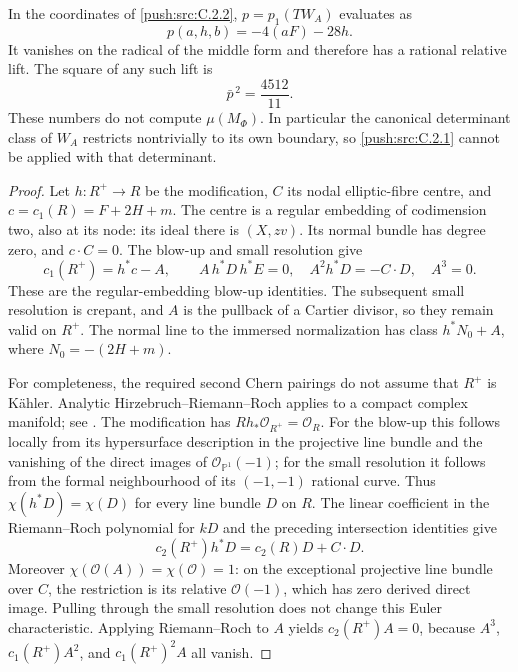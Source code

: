 \begin{proposition}\label{push:src:C.2.3}
In the coordinates of \ref{push:src:C.2.2}, $p=p_1(TW_A)$ evaluates as
\[
 p(a,h,b)=-4(aF)-28h.
\]
It vanishes on the radical of the middle form and therefore has a
rational relative lift. The square of any such lift is
\[
 \bar p^{\,2}=\frac{4512}{11}.
\]
These numbers do not compute $\mu(M_\Phi)$. In particular the
canonical determinant class of $W_A$ restricts nontrivially to its
own boundary, so \ref{push:src:C.2.1} cannot be applied with that determinant.
\end{proposition}

\begin{proof}
Let $h:R^+\to R$ be the modification, $C$ its nodal elliptic-fibre
centre, and $c=c_1(R)=F+2H+m$. The centre is a regular embedding of
codimension two, also at its node: its ideal there is $(X,zv)$.
Its normal bundle has degree zero, and $c\cdot C=0$. The blow-up
and small resolution give
\[
 c_1(R^+)=h^*c-A,\qquad
 A\,h^*D\,h^*E=0,\quad
 A^2h^*D=-C\cdot D,\quad A^3=0.
\]
These are the regular-embedding blow-up identities. The subsequent
small resolution is crepant, and $A$ is the pullback of a Cartier
divisor, so they remain valid on $R^+$. The normal line to the
immersed normalization has class
$h^*N_0+A$, where $N_0=-(2H+m)$.

For completeness, the required second Chern pairings do not assume
that $R^+$ is K\"ahler. Analytic Hirzebruch--Riemann--Roch applies to
a compact complex manifold; see \citet[Theorem~4.3, pp.~564--565]{AtiyahSinger1968IIIE}.
The modification has $Rh_*\mathcal O_{R^+}=\mathcal O_R$.
For the blow-up this follows locally from its hypersurface description
in the projective line bundle and the vanishing of the direct images
of $\mathcal O_{\mathbb P^1}(-1)$; for the small resolution it follows
from the formal neighbourhood of its $(-1,-1)$ rational curve.
Thus $\chi(h^*D)=\chi(D)$ for every line bundle $D$ on $R$.
The linear coefficient in the Riemann--Roch polynomial for $kD$
and the preceding intersection identities give
\[
 c_2(R^+)h^*D=c_2(R)D+C\cdot D.
\]
Moreover $\chi(\mathcal O(A))=\chi(\mathcal O)=1$: on the
exceptional projective line bundle over $C$, the restriction is its
relative $\mathcal O(-1)$, which has zero derived direct image.
Pulling through the small resolution does not change this Euler
characteristic. Applying Riemann--Roch to $A$ yields $c_2(R^+)A=0$,
because $A^3$, $c_1(R^+)A^2$, and $c_1(R^+)^2A$ all vanish.


\end{proof}
